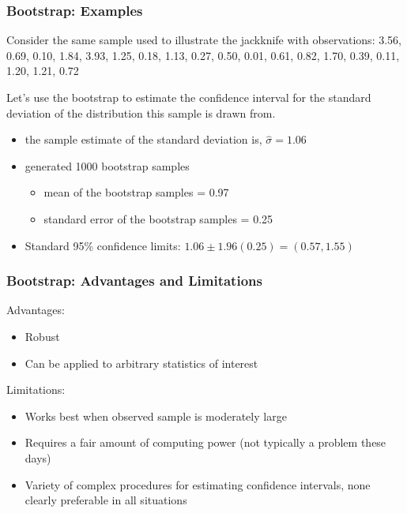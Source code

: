 \documentclass{beamer}
\begin{document}
\begin{frame}
  \frametitle{Bootstrap: Examples}

Consider the same sample used to illustrate the jackknife with observations: 3.56, 0.69, 0.10, 1.84, 3.93, 1.25, 0.18, 1.13, 0.27, 0.50, 0.01, 0.61, 0.82, 1.70, 0.39, 0.11, 1.20, 1.21, 0.72
\medskip

Let's use the bootstrap to estimate the confidence interval for the standard deviation of the distribution this sample is drawn from.
\smallskip

\begin{itemize}
    \item the sample estimate of the standard deviation is, $\widehat{\sigma} = 1.06$
    \item generated 1000 bootstrap samples
    \begin{itemize}
        \item mean of the bootstrap samples = 0.97
        \item standard error of the bootstrap samples = 0.25
    \end{itemize}
    \item Standard 95\% confidence limits: $1.06 \pm 1.96(0.25) = (0.57, 1.55)$
\end{itemize}


\end{frame}

\begin{frame}
  \frametitle{Bootstrap: Advantages and Limitations}

Advantages:
\begin{itemize}
    \item Robust
    \item Can be applied to arbitrary statistics of interest
\end{itemize}

Limitations:
\begin{itemize}
    \item Works best when observed sample is moderately large
    \item Requires a fair amount of computing power (not typically a problem these days)
    \item Variety of complex procedures for estimating confidence intervals, none clearly preferable in all situations
\end{itemize}

\end{frame}
\end{document}
